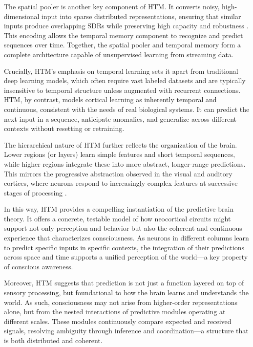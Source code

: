 \documentclass{article}
\begin{document}
The spatial pooler is another key component of HTM. It converts noisy, high-dimensional input into sparse distributed representations, ensuring that similar inputs produce overlapping SDRs while preserving high capacity and robustness \parencite{cui2017spatial}. This encoding allows the temporal memory component to recognize and predict sequences over time. Together, the spatial pooler and temporal memory form a complete architecture capable of unsupervised learning from streaming data.

Crucially, HTM's emphasis on temporal learning sets it apart from traditional deep learning models, which often require vast labeled datasets and are typically insensitive to temporal structure unless augmented with recurrent connections. HTM, by contrast, models cortical learning as inherently temporal and continuous, consistent with the needs of real biological systems. It can predict the next input in a sequence, anticipate anomalies, and generalize across different contexts without resetting or retraining.

The hierarchical nature of HTM further reflects the organization of the brain. Lower regions (or layers) learn simple features and short temporal sequences, while higher regions integrate these into more abstract, longer-range predictions. This mirrors the progressive abstraction observed in the visual and auditory cortices, where neurons respond to increasingly complex features at successive stages of processing \parencite{hawkins2009sequence, clark2016surfing}.

In this way, HTM provides a compelling instantiation of the predictive brain theory. It offers a concrete, testable model of how neocortical circuits might support not only perception and behavior but also the coherent and continuous experience that characterizes consciousness. As neurons in different columns learn to predict specific inputs in specific contexts, the integration of their predictions across space and time supports a unified perception of the world---a key property of conscious awareness.

Moreover, HTM suggests that prediction is not just a function layered on top of sensory processing, but foundational to how the brain learns and understands the world. As such, consciousness may not arise from higher-order representations alone, but from the nested interactions of predictive modules operating at different scales. These modules continuously compare expected and received signals, resolving ambiguity through inference and coordination---a structure that is both distributed and coherent.
\end{document}
